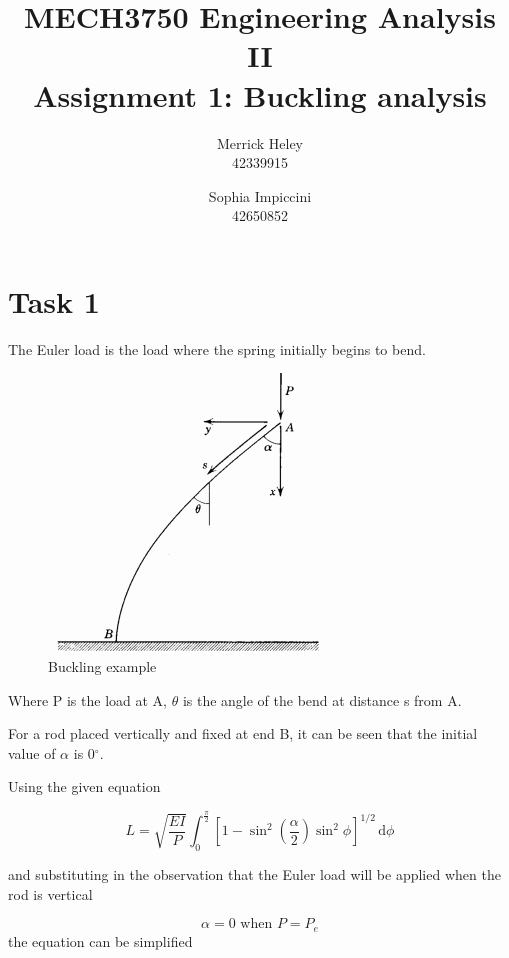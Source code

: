 \documentclass[a4paper,11pt,titlepage]{article}
\title{
MECH3750 Engineering Analysis II \\ 
Assignment 1: Buckling analysis
}
\author{
Merrick Heley\\
42339915
\and
Sophia Impiccini\\
42650852
}
\newcommand{\ud}{\,\mathrm{d}}
\begin{document}
\maketitle

\section*{Task 1}

The Euler load is the load where the spring initially begins to bend.

\begin{figure}[!hbp]
\centering
\includegraphics{buckling.png}
\caption{Buckling example}
\end{figure}

Where P is the load at A, $\theta$ is the angle of the bend at distance s 
from A.

For a rod placed vertically and fixed at end B, it can be seen that the initial
value of $\alpha$ is 0$^\circ$.

Using the given equation

\begin{equation}
L = 
\sqrt{\frac{EI}{P}} 
\int_0^{\frac{\pi}{2}} 
    {\displaystyle{\left[
        1-\sin^2{\left(\frac{\alpha}{2}\right)}\sin^2{\phi}
    \right]^{1/2}}}
\ud \phi
\end{equation}

and substituting in the observation that the Euler load will be applied when the
rod is vertical

\begin{equation}
\alpha = 0 \text{ when } P = P_e
\end{equation}
the equation can be simplified 
\end{document}

